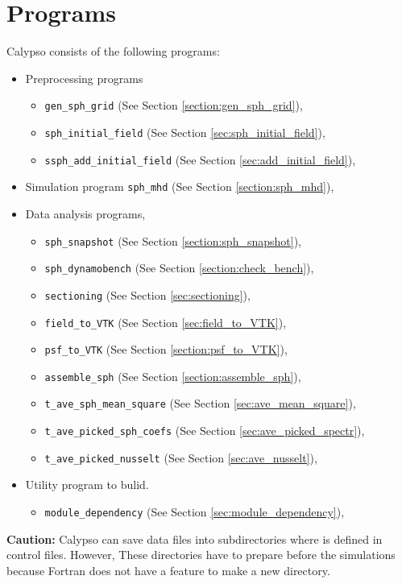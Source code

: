 \section{Programs}
Calypso consists of the following programs:
%
\begin{itemize}
\item Preprocessing programs
	\begin{itemize}
	\item {\tt gen\_sph\_grid} (See Section \ref{section:gen_sph_grid}),
	\item {\tt sph\_initial\_field} (See Section \ref{sec:sph_initial_field}),
	\item {\tt ssph\_add\_initial\_field} (See Section \ref{sec:add_initial_field}),
 	\end{itemize}
\item Simulation program {\tt sph\_mhd} (See Section \ref{section:sph_mhd}), 
\item Data analysis programs,
	\begin{itemize}
	\item {\tt sph\_snapshot} (See Section \ref{section:sph_snapshot}),
	\item {\tt sph\_dynamobench} (See Section \ref{section:check_bench}),
	\item {\tt sectioning} (See Section \ref{sec:sectioning}),
 	\item {\tt field\_to\_VTK} (See Section \ref{sec:field_to_VTK}),
 	\item {\tt psf\_to\_VTK} (See Section \ref{section:psf_to_VTK}),
 	\item {\tt assemble\_sph} (See Section \ref{section:assemble_sph}),
 	\item {\tt t\_ave\_sph\_mean\_square} (See Section \ref{sec:ave_mean_square}),
 	\item {\tt t\_ave\_picked\_sph\_coefs} (See Section \ref{sec:ave_picked_spectr}),
 	\item {\tt t\_ave\_picked\_nusselt} (See Section \ref{sec:ave_nusselt}),
	\end{itemize}
\item Utility program to bulid.
	\begin{itemize}
	\item {\tt module\_dependency} (See Section \ref{sec:module_dependency}),
	\end{itemize}
\end{itemize}
%

{\color{red} {\bf Caution:} Calypso can save data files into subdirectories where is defined in control files. However, These directories have to prepare before the simulations because Fortran does not have a feature to make a new directory.}

